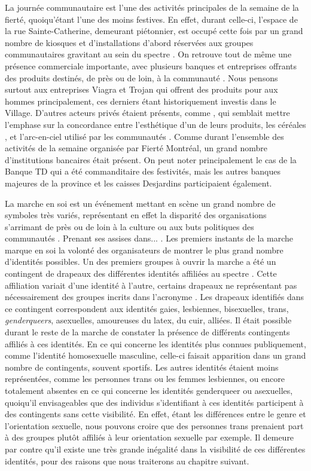 La journée communautaire est l'une des activités principales de la semaine de la fierté, quoiqu’étant l'une des moins festives.
En effet, durant celle-ci, l'espace de la rue Sainte-Catherine, demeurant piétonnier, est occupé cette fois par un grand nombre de kiosques et d'installations d'abord réservées aux groupes communautaires gravitant au sein du spectre \lgbt.
On retrouve tout de même une présence commerciale importante, avec plusieurs banques et entreprises offrants des produits destinés, de près ou de loin, à la communauté \lgbt.
Nous pensons surtout aux entreprises Viagra et Trojan qui offrent des produits pour aux hommes principalement, ces derniers étant historiquement investis dans le Village.
D'autres acteurs privés étaient présents, comme , qui semblait mettre l'emphase sur la concordance entre l'esthétique d'un de leurs produits, les céréales , et l'arc-en-ciel utilisé par les communautés \lgbt.
Comme durant l'ensemble des activités de la semaine organisée par Fierté Montréal, un grand nombre d'institutions bancaires était présent.
On peut noter principalement le cas de la Banque TD qui a été commanditaire des festivités, mais les autres banques majeures de la province et les caisses Desjardins participaient également.

La marche en soi est un événement mettant en scène un grand nombre de symboles très variés, représentant en effet la disparité des organisations s'arrimant de près ou de loin à la culture ou aux buts politiques des communautés \lgbt.
Prenant ses assises dans... .
Les premiers instants de la marche marque en soi la volonté des organisateurs de montrer le plus grand nombre d'identités possibles.
Un des premiers groupes à ouvrir la marche a été un contingent de drapeaux des différentes identités affiliées au spectre \lgbt{}.
Cette affiliation variait d'une identité à l'autre, certains drapeaux ne représentant pas nécessairement des groupes incrits dans l'acronyme \lgbt.
Les drapeaux identifiés dans ce contingent correspondent aux identités gaies, lesbiennes, bisexuelles, trans, \emph{genderqueers}, asexuelles, amoureuses du latex, du cuir, alliées.
Il était possible durant le reste de la marche de constater la présence de différents contingents affiliés à ces identités.
En ce qui concerne les identités plus connues publiquement, comme l'identité homosexuelle masculine, celle-ci faisait apparition dans un grand nombre de contingents, souvent sportifs.
Les autres identités étaient moins représentées, comme les personnes trans ou les femmes lesbiennes, ou encore totalement absentes en ce qui concerne les identités genderqueer ou asexuelles, quoiqu'il envisageables que des individus s'identifiant à ces identités participent à des contingents sans cette visibilité.
En effet, étant les différences entre le genre et l'orientation sexuelle, nous pouvons croire que des personnes trans prenaient part à des groupes plutôt affiliés à leur orientation sexuelle par exemple.
Il demeure par contre qu'il existe une très grande inégalité dans la visibilité de ces différentes identités, pour des raisons que nous traiterons au chapitre suivant.

